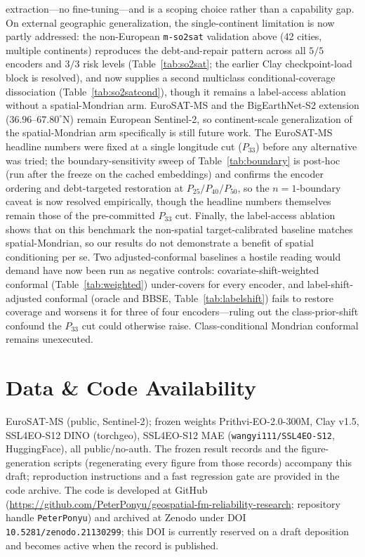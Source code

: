 \documentclass[11pt]{article}
\begin{document}
extraction---no fine-tuning---and is a scoping choice rather than a capability gap. On external geographic generalization, the single-continent limitation is now partly
addressed: the non-European \texttt{m-so2sat} validation above (42 cities, multiple continents) reproduces
the debt-and-repair pattern across all $5/5$ encoders and $3/3$ risk levels (Table~\ref{tab:so2sat}; the
earlier Clay checkpoint-load block is resolved), and now supplies a second multiclass conditional-coverage
dissociation (Table~\ref{tab:so2satcond}), though it remains a
label-access ablation without a spatial-Mondrian arm. EuroSAT-MS and the BigEarthNet-S2 extension ($36.96$--$67.80^\circ$N) remain European Sentinel-2,
so continent-scale generalization of the spatial-Mondrian arm specifically is still future work. The EuroSAT-MS headline
numbers were fixed at a single longitude cut ($P_{33}$) before any alternative was tried; the
boundary-sensitivity sweep of Table~\ref{tab:boundary} is post-hoc (run after the freeze on the cached
embeddings) and confirms the encoder ordering and debt-targeted restoration at $P_{25}/P_{40}/P_{50}$, so
the $n{=}1$-boundary caveat is now resolved empirically, though the headline numbers themselves remain
those of the pre-committed $P_{33}$ cut. Finally, the label-access ablation shows that on this benchmark
the non-spatial target-calibrated baseline matches spatial-Mondrian, so our results do not
demonstrate a benefit of spatial conditioning per se. Two adjusted-conformal baselines a hostile
reading would demand have now been run as negative controls: covariate-shift-weighted conformal
(Table~\ref{tab:weighted}) under-covers for every encoder, and label-shift-adjusted conformal
(oracle and BBSE, Table~\ref{tab:labelshift}) fails to restore coverage and worsens it for three of
four encoders---ruling out the class-prior-shift confound the $P_{33}$ cut could otherwise raise.
Class-conditional Mondrian conformal remains unexecuted.

\section*{Data \& Code Availability}
EuroSAT-MS (public, Sentinel-2); frozen weights Prithvi-EO-2.0-300M, Clay v1.5, SSL4EO-S12 DINO (torchgeo),
SSL4EO-S12 MAE (\texttt{wangyi111/SSL4EO-S12}, HuggingFace), all public/no-auth. The frozen result
records and the figure-generation scripts (regenerating every figure from those records) accompany this
draft; reproduction instructions and a fast regression gate are provided in the code archive. The code
is developed at GitHub (\url{https://github.com/PeterPonyu/geospatial-fm-reliability-research}; repository
handle \texttt{PeterPonyu}) and
archived at Zenodo under DOI \texttt{10.5281/zenodo.21130299}; this DOI is currently reserved on a draft
deposition and becomes active when the record is published.



\end{document}
